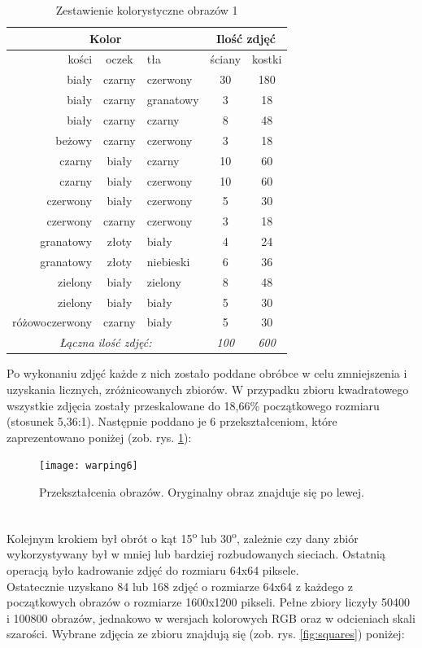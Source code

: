 \begin{table}[h!]
\centering
\begin{tabular}{rcl|cc}
\multicolumn{3}{c}{Kolor} & \multicolumn{2}{c}{Ilość zdjęć} \\ \hline
kości & oczek & tła & ściany & kostki \\ \hline
biały & czarny & czerwony & 30 & 180 \\
biały & czarny & granatowy & 3 & 18 \\
biały & czarny & czarny & 8 & 48 \\
beżowy & czarny & czerwony & 3 & 18 \\
czarny & biały & czarny & 10 & 60 \\
czarny & biały & czerwony & 10 & 60 \\
czerwony & biały & czerwony & 5 & 30 \\
czerwony & czarny & czerwony & 3 & 18 \\
granatowy & złoty & biały & 4 & 24 \\
granatowy & złoty & niebieski & 6 & 36 \\
zielony & biały & zielony & 8 & 48 \\
zielony & biały & biały & 5 & 30 \\
różowoczerwony & czarny & biały & 5 & 30 \\ \hline
\multicolumn{3}{c}{\textit{Łączna ilość zdjęć:}} & \textit{100} & \textit{600}
\end{tabular}
\vspace{0.2cm}
\caption{Zestawienie kolorystyczne obrazów 1}
\label{tab:zestawienie1}
\end{table}
Po wykonaniu zdjęć każde z nich zostało poddane obróbce w celu zmniejszenia i uzyskania licznych,
zróżnicowanych zbiorów. W przypadku zbioru kwadratowego wszystkie zdjęcia zostały przeskalowane
do 18,66\% początkowego rozmiaru (stosunek 5,36:1). Następnie poddano je 6 przekształceniom,
które zaprezentowano poniżej (zob. rys. \ref{fig:warping6}):
\begin{figure}[h!]
\centering
\texttt{[image: warping6]}
\caption{Przekształcenia obrazów. Oryginalny obraz znajduje się po lewej.}
\label{fig:warping6}
\end{figure}\\
Kolejnym krokiem był obrót o kąt
15\textsuperscript{o} lub 30\textsuperscript{o}, zależnie czy dany zbiór wykorzystywany był w mniej
lub bardziej rozbudowanych sieciach. Ostatnią operacją było kadrowanie zdjęć do rozmiaru 64x64 piksele.\\
Ostatecznie uzyskano 84 lub 168 zdjęć o rozmiarze 64x64 z każdego
z początkowych obrazów o rozmiarze 1600x1200 pikseli. Pełne zbiory liczyły 50400 i 100800
obrazów, jednakowo w wersjach kolorowych RGB oraz w odcieniach skali szarości.
Wybrane zdjęcia ze zbioru znajdują się (zob. rys. \ref{fig:squares}) poniżej: \newpage

